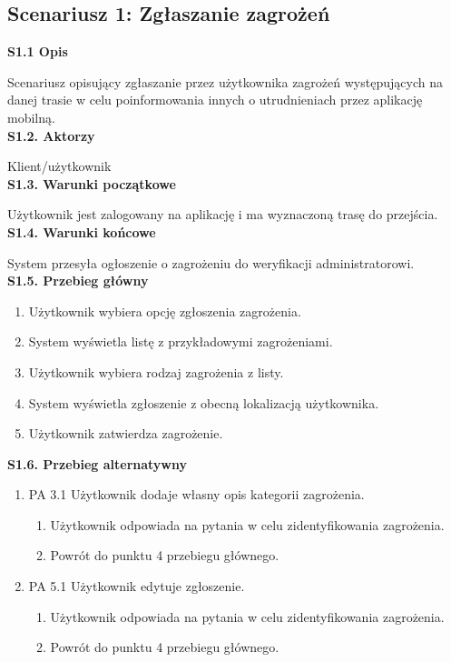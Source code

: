    \subsection*{Scenariusz 1: Zgłaszanie zagrożeń}
    \noindent
    \textbf{S1.1 Opis} \par
    Scenariusz opisujący zgłaszanie przez użytkownika zagrożeń występujących na danej trasie w celu poinformowania innych o utrudnieniach przez aplikację mobilną. \\
    \textbf{S1.2. Aktorzy} \par
    Klient/użytkownik \\
    \textbf{S1.3. Warunki początkowe} \par
    Użytkownik jest zalogowany na aplikację i ma wyznaczoną trasę do przejścia. \\
    \textbf{S1.4. Warunki końcowe} \par
    System przesyła ogłoszenie o zagrożeniu do weryfikacji administratorowi. \\
    \textbf{S1.5. Przebieg główny} 
    \begin{enumerate}
        \item Użytkownik wybiera opcję zgłoszenia zagrożenia.
        \item System wyświetla listę z przykładowymi zagrożeniami.
        \item Użytkownik wybiera rodzaj zagrożenia z listy.
        \item System wyświetla zgłoszenie z obecną lokalizacją użytkownika.
        \item Użytkownik zatwierdza zagrożenie.
    \end{enumerate}
    \textbf{S1.6. Przebieg alternatywny}\par 
    \begin{enumerate}
        \item []PA 3.1 Użytkownik dodaje własny opis kategorii zagrożenia.
             \begin{enumerate}
                \item Użytkownik odpowiada na pytania w celu zidentyfikowania zagrożenia.
                \item Powrót do punktu 4 przebiegu głównego.
            \end{enumerate}
        \item [] PA 5.1 Użytkownik edytuje zgłoszenie.
            \begin{enumerate}
                 \item Użytkownik odpowiada na pytania w celu zidentyfikowania zagrożenia.
                 \item Powrót do punktu 4 przebiegu głównego.
            \end{enumerate}
    \end{enumerate}
